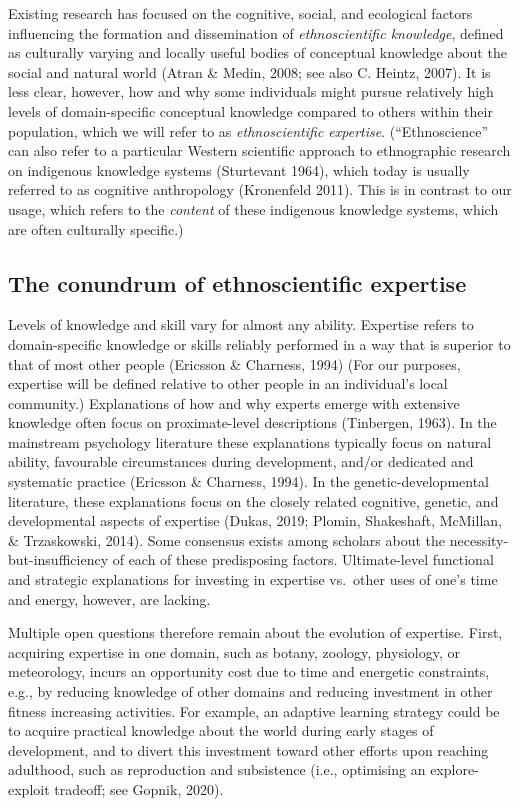 \documentclass[
  11pt,
]{article}
\begin{document}
Existing research has focused on the cognitive, social, and ecological factors influencing the formation and dissemination of \emph{ethnoscientific knowledge}, defined as culturally varying and locally useful bodies of conceptual knowledge about the social and natural world (Atran \& Medin, 2008; see also C. Heintz, 2007). It is less clear, however, how and why some individuals might pursue relatively high levels of domain-specific conceptual knowledge compared to others within their population, which we will refer to as \emph{ethnoscientific expertise}. (``Ethnoscience'' can also refer to a particular Western scientific approach to ethnographic research on indigenous knowledge systems (Sturtevant 1964), which today is usually referred to as cognitive anthropology (Kronenfeld 2011). This is in contrast to our usage, which refers to the \emph{content} of these indigenous knowledge systems, which are often culturally specific.)

\hypertarget{the-conundrum-of-ethnoscientific-expertise}{%
\subsection{The conundrum of ethnoscientific expertise}\label{the-conundrum-of-ethnoscientific-expertise}}

Levels of knowledge and skill vary for almost any ability. Expertise refers to domain-specific knowledge or skills reliably performed in a way that is superior to that of most other people (Ericsson \& Charness, 1994) (For our purposes, expertise will be defined relative to other people in an individual's local community.) Explanations of how and why experts emerge with extensive knowledge often focus on proximate-level descriptions (Tinbergen, 1963). In the mainstream psychology literature these explanations typically focus on natural ability, favourable circumstances during development, and/or dedicated and systematic practice (Ericsson \& Charness, 1994). In the genetic-developmental literature, these explanations focus on the closely related cognitive, genetic, and developmental aspects of expertise (Dukas, 2019; Plomin, Shakeshaft, McMillan, \& Trzaskowski, 2014). Some consensus exists among scholars about the necessity-but-insufficiency of each of these predisposing factors. Ultimate-level functional and strategic explanations for investing in expertise vs.~other uses of one's time and energy, however, are lacking.

Multiple open questions therefore remain about the evolution of expertise. First, acquiring expertise in one domain, such as botany, zoology, physiology, or meteorology, incurs an opportunity cost due to time and energetic constraints, e.g., by reducing knowledge of other domains and reducing investment in other fitness increasing activities. For example, an adaptive learning strategy could be to acquire practical knowledge about the world during early stages of development, and to divert this investment toward other efforts upon reaching adulthood, such as reproduction and subsistence (i.e., optimising an explore-exploit tradeoff; see Gopnik, 2020).
\end{document}
